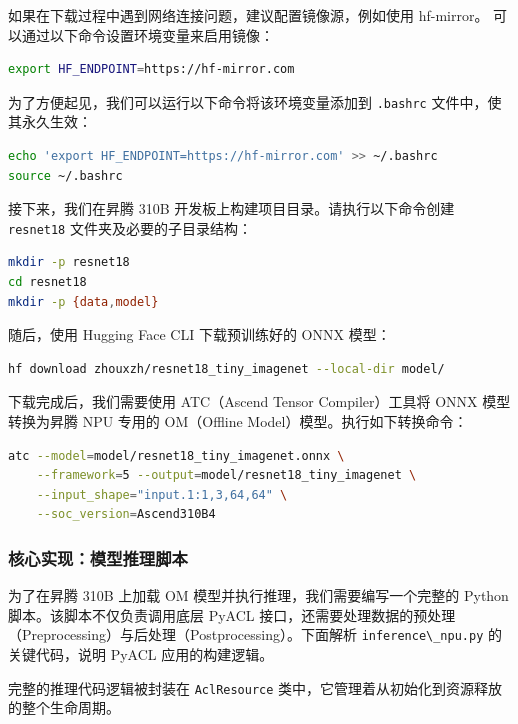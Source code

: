 如果在下载过程中遇到网络连接问题，建议配置镜像源，例如使用 hf-mirror。
可以通过以下命令设置环境变量来启用镜像：

\begin{lstlisting}[language=bash]
export HF_ENDPOINT=https://hf-mirror.com
\end{lstlisting}

为了方便起见，我们可以运行以下命令将该环境变量添加到
\passthrough{\lstinline!.bashrc!} 文件中，使其永久生效：

\begin{lstlisting}[language=bash]
echo 'export HF_ENDPOINT=https://hf-mirror.com' >> ~/.bashrc
source ~/.bashrc
\end{lstlisting}

接下来，我们在昇腾 310B 开发板上构建项目目录。请执行以下命令创建
\passthrough{\lstinline!resnet18!} 文件夹及必要的子目录结构：

\begin{lstlisting}[language=bash]
mkdir -p resnet18
cd resnet18
mkdir -p {data,model}
\end{lstlisting}

随后，使用 Hugging Face CLI 下载预训练好的 ONNX 模型：

\begin{lstlisting}[language=bash]
hf download zhouxzh/resnet18_tiny_imagenet --local-dir model/
\end{lstlisting}

下载完成后，我们需要使用 ATC（Ascend Tensor Compiler）工具将 ONNX
模型转换为昇腾 NPU 专用的 OM（Offline Model）模型。执行如下转换命令：

\begin{lstlisting}[language=bash]
atc --model=model/resnet18_tiny_imagenet.onnx \
    --framework=5 --output=model/resnet18_tiny_imagenet \
    --input_shape="input.1:1,3,64,64" \
    --soc_version=Ascend310B4
\end{lstlisting}

\subsubsection{核心实现：模型推理脚本}\label{src-book-chapter4-h28}

为了在昇腾 310B 上加载 OM 模型并执行推理，我们需要编写一个完整的 Python
脚本。该脚本不仅负责调用底层 PyACL
接口，还需要处理数据的预处理（Preprocessing）与后处理（Postprocessing）。下面解析
\passthrough{\lstinline!inference\_npu.py!} 的关键代码，说明 PyACL
应用的构建逻辑。

完整的推理代码逻辑被封装在 \passthrough{\lstinline!AclResource!}
类中，它管理着从初始化到资源释放的整个生命周期。

